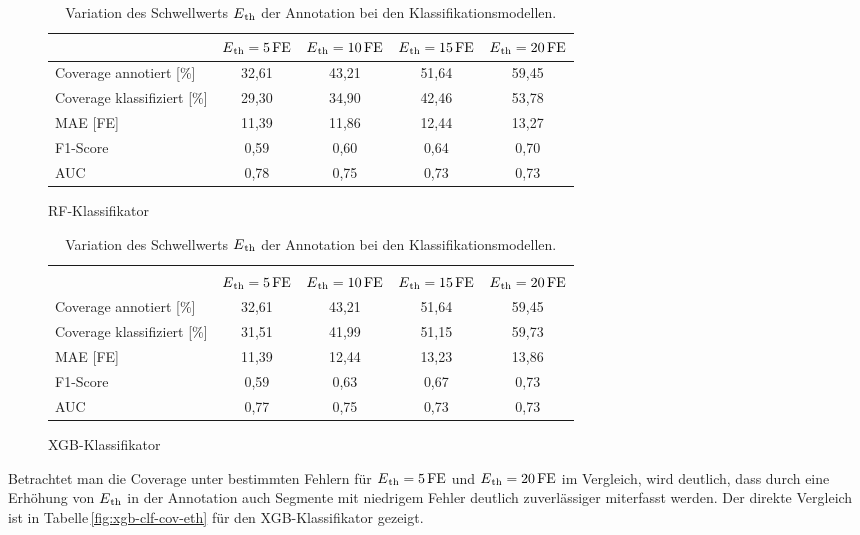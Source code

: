 \begin{table}[H]
	\begin{subfigure}{\textwidth}
	\centering
	\begin{tabular}{l || c | c | c | c}
								& $E\textsubscript{th}=5\,\si{FE}$	& $E\textsubscript{th}=10\,\si{FE}$	& $E\textsubscript{th}=15\,\si{FE}$	& $E\textsubscript{th}=20\,\si{FE}$	\\ \hline
	Coverage annotiert [\%]		& 32,61						& 43{,}21 					& 51,64						& 59,45\\
 	Coverage klassifiziert [\%]	& 29,30						& 34,90 					& 42,46						& 53,78\\
 	\ac{MAE} [FE]				& 11,39						& 11,86						& 12,44						& 13,27\\
 	F1-Score 					& 0,59						& 0,60						& 0,64						& 0,70\\
 	AUC 						& 0,78						& 0,75						& 0,73						& 0,73\\
 	\end{tabular}	
	\caption{\ac{RF}-Klassifikator}
	\end{subfigure}
	\begin{subfigure}{\textwidth}
	\centering
	\begin{tabular}{l || c | c | c | c}
	\multicolumn{5}{l}{	}	\\
								& $E\textsubscript{th}=5\,\si{FE}$	& $E\textsubscript{th}=10\,\si{FE}$	& $E\textsubscript{th}=15\,\si{FE}$	& $E\textsubscript{th}=20\,\si{FE}$	\\ \hline
	Coverage annotiert [\%]		& 32,61						& 43{,}21 					& 51,64						& 59,45\\
 	Coverage klassifiziert [\%]	& 31,51						& 41,99 					& 51,15						& 59,73\\
 	\ac{MAE} [FE]				& 11,39						& 12,44						& 13,23						& 13,86\\
 	F1-Score 					& 0,59						& 0,63						& 0,67						& 0,73\\
 	AUC 						& 0,77						& 0,75						& 0,73						& 0,73\\
 	\end{tabular}	
	\caption{\ac{XGB}-Klassifikator}
	\end{subfigure}
	\caption{Variation des Schwellwerts $E\textsubscript{th}$ der Annotation bei den Klassifikationsmodellen.}
	\label{fig:var-eth-clf}
\end{table}

Betrachtet man die Coverage unter bestimmten Fehlern für $E\textsubscript{th}= 5\text{\,}\si{FE}$ und $E\textsubscript{th}= 20\text{\,}\si{FE}$ im Vergleich, wird deutlich, dass durch eine Erhöhung von $E\textsubscript{th}$ in der Annotation auch Segmente mit niedrigem Fehler deutlich zuverlässiger miterfasst werden. Der direkte Vergleich ist in Tabelle\,\ref{fig:xgb-clf-cov-eth} für den \ac{XGB}-Klassifikator gezeigt.

